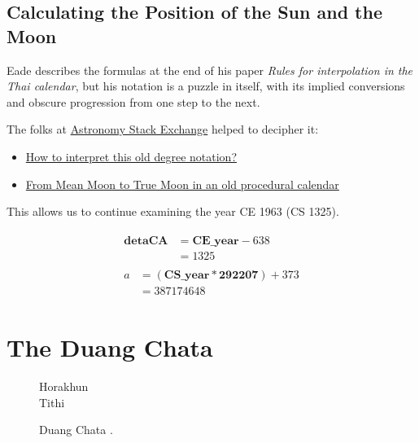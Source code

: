 \documentclass[11pt,oneside]{memoir-article}
\begin{document}
\section{Calculating the Position of the Sun and the Moon}
\label{sec-4-5}

Eade describes the formulas at the end of his paper \emph{Rules for interpolation in
the Thai calendar}\autocite{eade2000rules}, but his notation is a puzzle in itself,
with its implied conversions and obscure progression from one step to the next.

The folks at \href{http://astronomy.stackexchange.com/}{Astronomy Stack Exchange} helped to decipher it:

\begin{itemize}
\item \href{http://astronomy.stackexchange.com/questions/11753/how-to-interpret-this-old-degree-notation}{How to interpret this old degree notation?}
\item \href{http://astronomy.stackexchange.com/questions/12052/from-mean-moon-to-true-moon-in-an-old-procedural-calendar}{From Mean Moon to True Moon in an old procedural calendar}
\end{itemize}

This allows us to continue examining the year CE 1963 (CS 1325).


\begin{align}
\begin{split}
   \mathbf{detaCA} &= \mathbf{CE\_year} - 638\\
                     &= 1325
\end{split}\\
\begin{split}
                   a &= (\mathbf{CS\_year} * \mathbf{292207}) + 373\\
                     &= 387174648
\end{split}
\end{align}

\chapter{The Duang Chata}
\label{sec-5}
\label{duangchata}

\begin{figure}[h]
\caption{Duang Chata .}
\resizebox{\linewidth}{!}{\DuangChata[Sun={2/0/0}, Moon={4/5/10}, fancy]}

Horakhun\\
Tithi

\end{figure}
\end{document}
